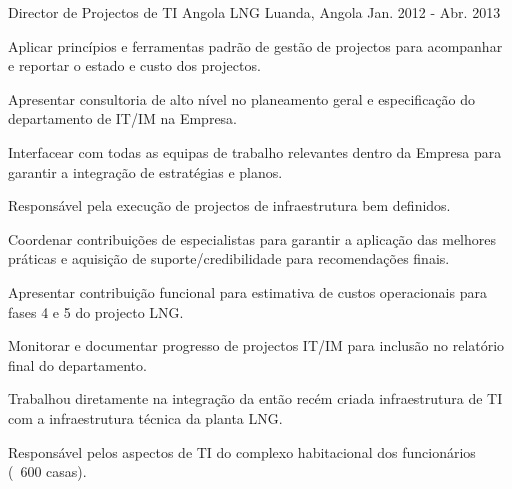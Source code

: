 \begin{cventries}
\cventry
{Director de Projectos de TI} %
{Angola LNG} %
{Luanda, Angola} %
{Jan. 2012 - Abr. 2013} %
{ %
\begin{cvitems}
\item {Aplicar princípios e ferramentas padrão de gestão de projectos para acompanhar e reportar o estado e custo dos projectos.}
\item {Apresentar consultoria de alto nível no planeamento geral e especificação do departamento de IT/IM na Empresa.}
\item {Interfacear com todas as equipas de trabalho relevantes dentro da Empresa para garantir a integração de estratégias e planos.}
\item {Responsável pela execução de projectos de infraestrutura bem definidos.}
\item {Coordenar contribuições de especialistas para garantir a aplicação das melhores práticas e aquisição de suporte/credibilidade para recomendações finais.}
\item {Apresentar contribuição funcional para estimativa de custos operacionais para fases 4 e 5 do projecto LNG.}
\item {Monitorar e documentar progresso de projectos IT/IM para inclusão no relatório final do departamento.}
\item {Trabalhou diretamente na integração da então recém criada infraestrutura de TI com a infraestrutura técnica da planta LNG.}
\item {Responsável pelos aspectos de TI do complexo habitacional dos funcionários (~600 casas).}
\end{cvitems}
}



\end{cventries}
